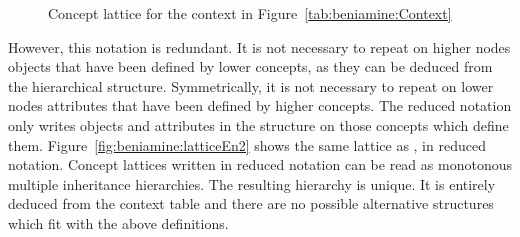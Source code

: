 \documentclass[output=paper]{langscibook}
\begin{document}
    \begin{sidewaysfigure}
            \small
        \caption{Concept lattice for the context in Figure~\ref{tab:beniamine:Context}\label{fig:beniamine:latticeEn}}
    \end{sidewaysfigure}

    However, this notation is redundant. It is not necessary to repeat on higher nodes objects that have been defined by lower concepts, as they can be deduced from the hierarchical structure. Symmetrically, it is not necessary to repeat on lower nodes attributes that have been defined by higher concepts. The reduced notation only writes objects and attributes in the structure on those concepts which define them. Figure~\ref{fig:beniamine:latticeEn2} shows the same lattice as , in reduced notation. Concept lattices written in reduced notation can be read as monotonous multiple inheritance hierarchies. The resulting hierarchy is unique. It is entirely deduced from the context table and there are no possible alternative structures which fit with the above definitions.
\end{document}
